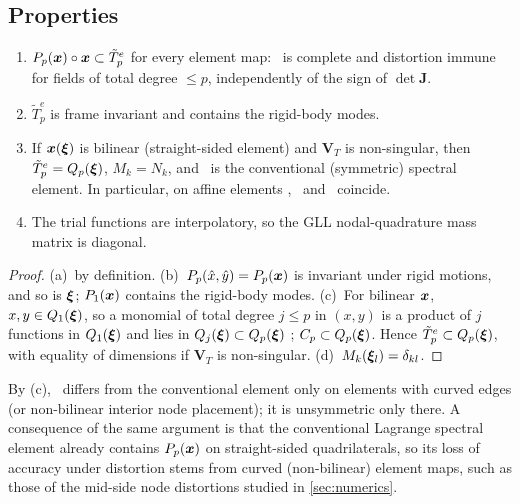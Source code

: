 \subsection{Properties}
\begin{proposition}\label{prop:hybrid}
\begin{enumerate}
\item[(a)] $P_p(\bm{x})\circ\bm{x}\subset\tilde T_p^e$ for every element map: \PH\ is complete and
  distortion immune for fields of total degree $\le p$, independently of the sign of $\det\bm J$.
\item[(b)] $\tilde T_p^e$ is frame invariant and contains the rigid-body modes.
\item[(c)] If $\bm{x}(\bm{\xi})$ is bilinear (straight-sided element) and $\bm V_T$ is non-singular,
  then $\tilde T_p^e=Q_p(\bm{\xi})$, $M_k=N_k$, and \PH\ is the conventional (symmetric) spectral
  element. In particular, on affine elements \PH, \PM\ and \PP\ coincide.
\item[(d)] The trial functions are interpolatory, so the GLL nodal-quadrature mass matrix is
  diagonal.
\end{enumerate}
\end{proposition}
\begin{proof}
(a)~by definition. (b)~$P_p(\hat x,\hat y)=P_p(\bm{x})$ is invariant under rigid motions, and so is
$\bm{\xi}$; $P_1(\bm{x})$ contains the rigid-body modes. (c)~For bilinear $\bm{x}$, $x,y\in Q_1(\bm{\xi})$, so
a monomial of total degree $j\le p$ in $(x,y)$ is a product of $j$ functions in $Q_1(\bm{\xi})$ and lies
in $Q_j(\bm{\xi})\subset Q_p(\bm{\xi})$ \cite{Arnold2002Approximation}; $C_p\subset Q_p(\bm{\xi})$. Hence
$\tilde T_p^e\subset Q_p(\bm{\xi})$, with equality of dimensions if $\bm V_T$ is non-singular.
(d)~$M_k(\bm{\xi}_l)=\delta_{kl}$.
\end{proof}
By (c), \PH\ differs from the conventional element only on elements with curved edges (or
non-bilinear interior node placement); it is unsymmetric only there. A consequence of the same
argument is that the conventional Lagrange spectral element already contains $P_p(\bm{x})$ on
straight-sided quadrilaterals, so its loss of accuracy under distortion stems from curved
(non-bilinear) element maps, such as those of the mid-side node distortions studied in
\cref{sec:numerics}.

